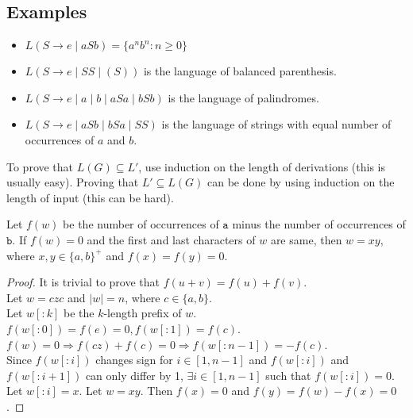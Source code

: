 \subsection{Examples}
\begin{itemize}
\item $L(S \rightarrow e \mid aSb) = \{a^nb^n: n \ge 0\}$
\item $L(S \rightarrow e \mid SS \mid (S))$ is the language of balanced parenthesis.
\item $L(S \rightarrow e \mid a \mid b \mid aSa \mid bSb)$ is the language of palindromes.
\item $L(S \rightarrow e \mid aSb \mid bSa \mid SS)$ is the language of strings with
  equal number of occurrences of $a$ and $b$.
\end{itemize}

To prove that $L(G) \subseteq L'$, use induction on the length of derivations
(this is usually easy).
Proving that $L' \subseteq L(G)$ can be done by using induction on the length of input
(this can be hard).

\begin{lemma}
\label{a-b-count-lemma}
Let $f(w)$ be the number of occurrences of $\texttt{a}$ minus the number of occurrences of $\texttt{b}$.
If $f(w) = 0$ and the first and last characters of $w$ are same, then
$w = xy$, where $x, y \in \{a, b\}^+$ and $f(x) = f(y) = 0$.
\end{lemma}
\begin{proof}
It is trivial to prove that $f(u + v) = f(u) + f(v)$.\\
Let $w = czc$ and $|w| = n$, where $c \in \{a, b\}$.\\
Let $w[:k]$ be the $k$-length prefix of $w$.\\
$f(w[:0]) = f(e) = 0, f(w[:1]) = f(c)$.\\
$f(w) = 0 \Rightarrow f(cz) + f(c) = 0 \Rightarrow f(w[:n-1]) = -f(c)$.\\
Since $f(w[:i])$ changes sign for $i \in [1, n-1]$ and $f(w[:i])$ and $f(w[:i+1])$
can only differ by 1, $\exists i \in [1, n-1]$ such that $f(w[:i]) = 0$.\\
Let $w[:i] = x$. Let $w = xy$.
Then $f(x) = 0$ and $f(y) = f(w) - f(x) = 0$.
\end{proof}

